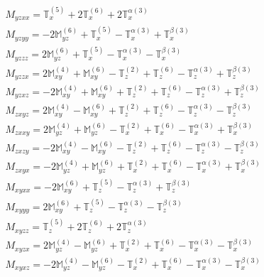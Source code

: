 \documentclass[fleqn,8pt,landscape]{jsarticle}
\begin{document}
\begin{align*}
& M_{yzxx} = \mathbb{T}_{x}^{(5)} + 2 \mathbb{T}_{x}^{(6)} + 2 \mathbb{T}_{x}^{\alpha(3)} \\
& M_{yzyy} = - 2 \mathbb{M}_{yz}^{(6)} + \mathbb{T}_{x}^{(5)} - \mathbb{T}_{x}^{\alpha(3)} + \mathbb{T}_{x}^{\beta(3)} \\
& M_{yzzz} = 2 \mathbb{M}_{yz}^{(6)} + \mathbb{T}_{x}^{(5)} - \mathbb{T}_{x}^{\alpha(3)} - \mathbb{T}_{x}^{\beta(3)} \\
& M_{yzzx} = 2 \mathbb{M}_{xy}^{(4)} + \mathbb{M}_{xy}^{(6)} - \mathbb{T}_{z}^{(2)} + \mathbb{T}_{z}^{(6)} - \mathbb{T}_{z}^{\alpha(3)} + \mathbb{T}_{z}^{\beta(3)} \\
& M_{yzxz} = - 2 \mathbb{M}_{xy}^{(4)} + \mathbb{M}_{xy}^{(6)} + \mathbb{T}_{z}^{(2)} + \mathbb{T}_{z}^{(6)} - \mathbb{T}_{z}^{\alpha(3)} + \mathbb{T}_{z}^{\beta(3)} \\
& M_{zxyz} = 2 \mathbb{M}_{xy}^{(4)} - \mathbb{M}_{xy}^{(6)} + \mathbb{T}_{z}^{(2)} + \mathbb{T}_{z}^{(6)} - \mathbb{T}_{z}^{\alpha(3)} - \mathbb{T}_{z}^{\beta(3)} \\
& M_{zxxy} = 2 \mathbb{M}_{yz}^{(4)} + \mathbb{M}_{yz}^{(6)} - \mathbb{T}_{x}^{(2)} + \mathbb{T}_{x}^{(6)} - \mathbb{T}_{x}^{\alpha(3)} + \mathbb{T}_{x}^{\beta(3)} \\
& M_{zxzy} = - 2 \mathbb{M}_{xy}^{(4)} - \mathbb{M}_{xy}^{(6)} - \mathbb{T}_{z}^{(2)} + \mathbb{T}_{z}^{(6)} - \mathbb{T}_{z}^{\alpha(3)} - \mathbb{T}_{z}^{\beta(3)} \\
& M_{zxyx} = - 2 \mathbb{M}_{yz}^{(4)} + \mathbb{M}_{yz}^{(6)} + \mathbb{T}_{x}^{(2)} + \mathbb{T}_{x}^{(6)} - \mathbb{T}_{x}^{\alpha(3)} + \mathbb{T}_{x}^{\beta(3)} \\
& M_{xyxx} = - 2 \mathbb{M}_{xy}^{(6)} + \mathbb{T}_{z}^{(5)} - \mathbb{T}_{z}^{\alpha(3)} + \mathbb{T}_{z}^{\beta(3)} \\
& M_{xyyy} = 2 \mathbb{M}_{xy}^{(6)} + \mathbb{T}_{z}^{(5)} - \mathbb{T}_{z}^{\alpha(3)} - \mathbb{T}_{z}^{\beta(3)} \\
& M_{xyzz} = \mathbb{T}_{z}^{(5)} + 2 \mathbb{T}_{z}^{(6)} + 2 \mathbb{T}_{z}^{\alpha(3)} \\
& M_{xyzx} = 2 \mathbb{M}_{yz}^{(4)} - \mathbb{M}_{yz}^{(6)} + \mathbb{T}_{x}^{(2)} + \mathbb{T}_{x}^{(6)} - \mathbb{T}_{x}^{\alpha(3)} - \mathbb{T}_{x}^{\beta(3)} \\
& M_{xyxz} = - 2 \mathbb{M}_{yz}^{(4)} - \mathbb{M}_{yz}^{(6)} - \mathbb{T}_{x}^{(2)} + \mathbb{T}_{x}^{(6)} - \mathbb{T}_{x}^{\alpha(3)} - \mathbb{T}_{x}^{\beta(3)}
\end{align*}
\end{document}
